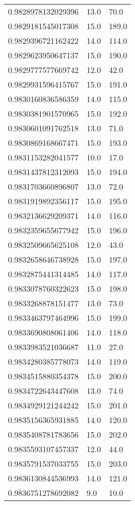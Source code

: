 \begin{center}
\begin{supertabular}[H]{p{0.30\textwidth}p{0.05\textwidth}p{0.05\textwidth}}
0.9828978132029396 & 13.0 & 70.0 \\ 
0.9829181545017308 & 15.0 & 189.0 \\ 
0.9829396721162422 & 14.0 & 114.0 \\ 
0.9829623950647137 & 15.0 & 190.0 \\ 
0.9829777577669742 & 12.0 & 42.0 \\ 
0.9829931596415767 & 15.0 & 191.0 \\ 
0.9830160836586359 & 14.0 & 115.0 \\ 
0.9830381901570965 & 15.0 & 192.0 \\ 
0.9830601091762518 & 13.0 & 71.0 \\ 
0.9830869168667471 & 15.0 & 193.0 \\ 
0.9831153282041577 & 10.0 & 17.0 \\ 
0.9831437812312093 & 15.0 & 194.0 \\ 
0.9831703660896807 & 13.0 & 72.0 \\ 
0.9831919892356117 & 15.0 & 195.0 \\ 
0.9832136629209371 & 14.0 & 116.0 \\ 
0.9832359655677942 & 15.0 & 196.0 \\ 
0.9832509665625108 & 12.0 & 43.0 \\ 
0.9832658646738928 & 15.0 & 197.0 \\ 
0.9832875441314485 & 14.0 & 117.0 \\ 
0.9833078760322623 & 15.0 & 198.0 \\ 
0.9833268878151477 & 13.0 & 73.0 \\ 
0.9833463797464996 & 15.0 & 199.0 \\ 
0.9833690808061406 & 14.0 & 118.0 \\ 
0.9833983521036687 & 11.0 & 27.0 \\ 
0.9834280385778073 & 14.0 & 119.0 \\ 
0.9834515880354378 & 15.0 & 200.0 \\ 
0.9834722643447608 & 13.0 & 74.0 \\ 
0.9834929121244242 & 15.0 & 201.0 \\ 
0.9835156365931885 & 14.0 & 120.0 \\ 
0.9835408781783656 & 15.0 & 202.0 \\ 
0.9835593107457337 & 12.0 & 44.0 \\ 
0.9835791537033755 & 15.0 & 203.0 \\ 
0.9836130844536993 & 14.0 & 121.0 \\ 
0.9836751278692082 & 9.0 & 10.0 \\ 

\end{supertabular}
\end{center}
